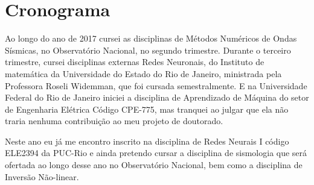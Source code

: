 \chapter{Cronograma}

Ao longo do ano de 2017 cursei as disciplinas de Métodos Numéricos de Ondas Sísmicas, no Observatório Nacional, no segundo trimestre. Durante o terceiro trimestre, cursei disciplinas externas Redes Neuronais, do Instituto de matemática da Universidade do Estado do Rio de Janeiro, ministrada pela Professora Roseli Widemman, que foi cursada semestralmente. E na Universidade Federal do Rio de Janeiro iniciei a disciplina de Aprendizado de Máquina do setor de Engenharia Elétrica Código CPE-775, mas tranquei ao julgar que ela não traria nenhuma contribuição ao meu projeto de doutorado.

Neste ano eu já me encontro inscrito na disciplina de Redes Neurais I código ELE2394 da PUC-Rio e ainda pretendo cursar a disciplina de sismologia que será ofertada ao longo desse ano no Observatório Nacional, bem como a disciplina de Inversão Não-linear. 


